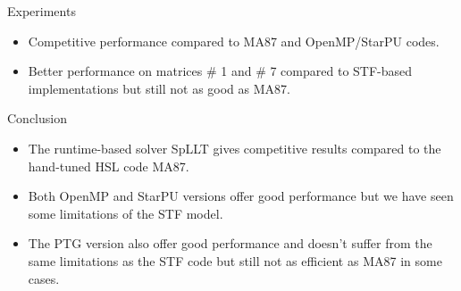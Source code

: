 \documentclass[unknownkeysallowed]{beamer}
\newcommand{\db}[1]{\textcolor{mblue}{#1\xspace}}
\newcommand{\dd}[1]{\textcolor{gray!70}{#1\xspace}}
\begin{document}
\begin{frame}{Experiments}
\begin{center}
  \end{center}
  \begin{itemize}
  \item Competitive performance compared to MA87 and OpenMP/StarPU
    codes.
  \item Better performance on matrices \# 1 and \# 7 compared to
    STF-based implementations but still not as good as MA87.
  \end{itemize}
\end{frame}

\begin{frame}{Conclusion}
  \begin{itemize}
  \item The \alert{runtime-based} solver \db{SpLLT} gives competitive
    results compared to the \db{hand-tuned HSL code MA87}.

    \vspace{0.4cm}

  \item Both \alert{OpenMP} and \alert{StarPU} versions offer good
    performance but we have seen some limitations of the \db{STF
      model}.

    \vspace{0.4cm}

  \item The \alert{PTG} version also offer good performance and
    doesn't suffer from the same limitations as the \alert{STF} code
    but still not as efficient as MA87 in some cases.
  \end{itemize}
\end{frame}
\end{document}
